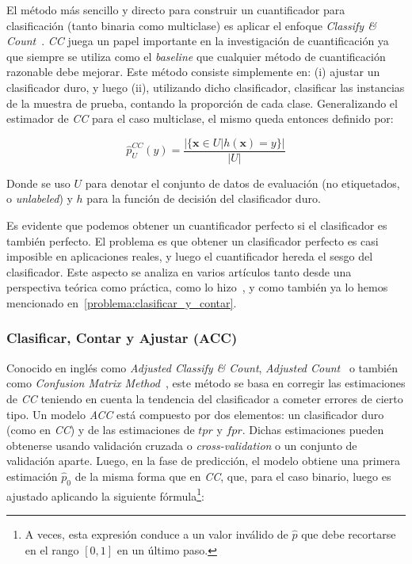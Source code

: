 El método más sencillo y directo para construir un cuantificador para
clasificación (tanto binaria como multiclase) es aplicar el enfoque {\it
Classify \& Count\/}~\cite{forman2005counting}. {\it CC\/} juega un papel
importante en la investigación de cuantificación ya que siempre se utiliza como
el {\it baseline\/} que cualquier método de cuantificación razonable debe
mejorar. Este método consiste simplemente en: (i) ajustar un clasificador duro,
y luego (ii), utilizando dicho clasificador, clasificar las instancias de la
muestra de prueba, contando la proporción de cada clase. Generalizando el
estimador de {\it CC\/} para el caso multiclase, el mismo queda entonces
definido por:

\begin{equation}
    \hat p^{CC}_{U}(y) = \frac{|\{\mathbf{x} \in U|h(\mathbf{x})=y\}|}{|U|}
\end{equation}

Donde se uso $U$ para denotar el conjunto de datos de evaluación (no
etiquetados, o {\it unlabeled\/}) y $h$ para la función de decisión del
clasificador duro.

Es evidente que podemos obtener un cuantificador perfecto si el clasificador es
también perfecto. El problema es que obtener un clasificador perfecto es casi
imposible en aplicaciones reales, y luego el cuantificador hereda el sesgo del
clasificador. Este aspecto se analiza en varios artículos tanto desde una
perspectiva teórica como práctica, como lo
hizo~\citeauthor{forman2008quantifying}, y como también ya lo hemos mencionado
en~\ref{problema:clasificar_y_contar}.

\subsubsection{Clasificar, Contar y Ajustar (ACC)}

Conocido en inglés como {\it Adjusted Classify \& Count}, {\it Adjusted
Count\/}~\cite{forman2008quantifying} o también como {\it Confusion Matrix
Method\/}~\cite{saerens2002adjusting}, este método se basa en corregir las
estimaciones de {\it CC\/} teniendo en cuenta la tendencia del clasificador a
cometer errores de cierto tipo. Un modelo {\it ACC\/} está compuesto por dos
elementos: un clasificador duro (como en {\it CC\/}) y de las estimaciones de
$tpr$ y $fpr$. Dichas estimaciones pueden obtenerse usando validación cruzada o
{\it cross-validation\/} o un conjunto de validación aparte. Luego, en la fase
de predicción, el modelo obtiene una primera estimación $\hat p_0$ de la misma
forma que en {\it CC}, que, para el caso binario, luego es ajustado aplicando la
siguiente fórmula\footnote{A veces, esta expresión conduce a un valor inválido
de $\hat p$ que debe recortarse en el rango $[0, 1]$ en un último paso.}:

